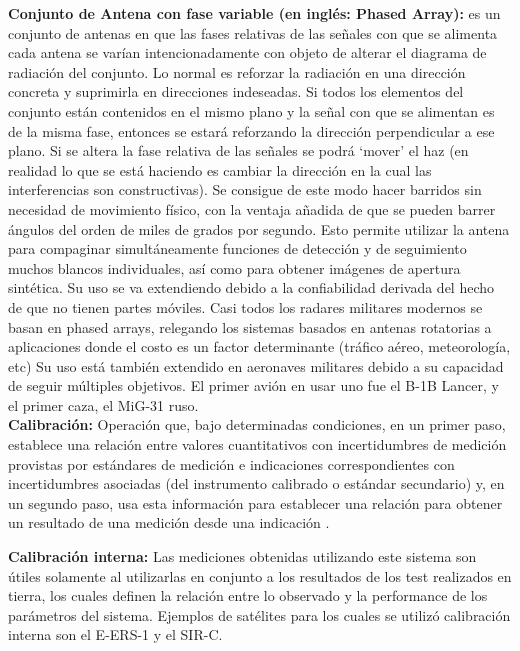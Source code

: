 {\textbf{Conjunto de Antena con fase variable (en inglés: Phased Array):}} es un conjunto de antenas en que las fases relativas
de las señales con que se alimenta cada antena se varían intencionadamente con objeto de alterar el diagrama de radiación del
conjunto. Lo normal es reforzar la radiación en una dirección concreta y suprimirla en direcciones indeseadas. Si todos los
elementos del conjunto están contenidos en el mismo plano y la señal con que se alimentan es de la misma fase,
entonces se estará reforzando la dirección perpendicular a ese plano. Si se altera la fase relativa de las señales se podrá
\enquote*{mover} el haz (en realidad lo que se está haciendo es cambiar la dirección en la cual las interferencias son
constructivas). Se consigue de este modo hacer barridos sin necesidad de movimiento físico, con la ventaja añadida de que
se pueden barrer ángulos del orden de miles de grados por segundo. Esto permite utilizar la antena para compaginar
simultáneamente funciones de detección y de seguimiento muchos blancos individuales, así como para obtener imágenes de
apertura sintética. Su uso se va extendiendo debido a la confiabilidad derivada del hecho de que no tienen partes móviles.
Casi todos los radares militares modernos se basan en phased arrays, relegando los sistemas basados en antenas rotatorias a
aplicaciones donde el costo es un factor determinante (tráfico aéreo, meteorología, etc) Su uso está también extendido en
aeronaves militares debido a su capacidad de seguir múltiples objetivos. El primer avión en usar uno fue el B-1B Lancer, y
el primer caza, el MiG-31 ruso.\\

{\textbf{Calibración:}} Operación que, bajo determinadas condiciones, en un primer paso, establece una relación entre
valores cuantitativos con incertidumbres de medición provistas por estándares de medición e indicaciones correspondientes
con incertidumbres asociadas (del instrumento calibrado o estándar secundario) y, en un segundo paso, usa
esta información para establecer una relación para obtener un resultado de una medición desde una indicación \cite{CalDef}.

{\textbf{Calibración interna:}} Las mediciones obtenidas utilizando este sistema son útiles solamente al utilizarlas en
conjunto a los resultados de los test realizados en tierra, los cuales definen la relación entre lo observado y la
performance de los parámetros del sistema. Ejemplos de satélites para los cuales se utilizó calibración interna son el
E-ERS-1 y el SIR-C.

